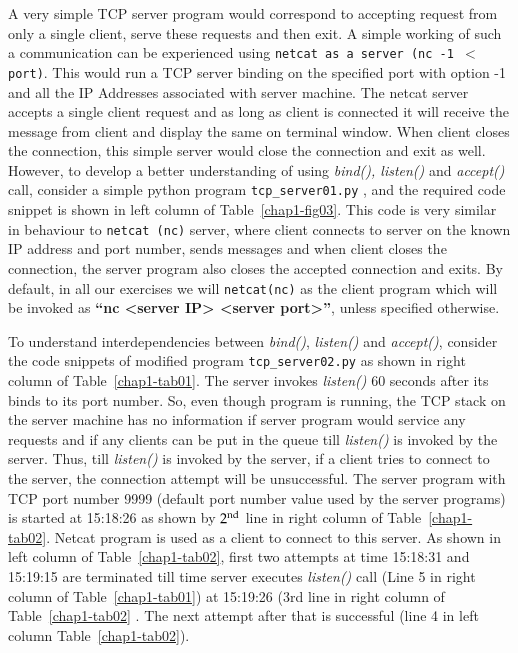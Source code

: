\begin{multicols}{2}
A very simple TCP server program would correspond to accepting request from only a single client, serve these requests and then exit. A simple working of such a communication can be experienced using \texttt{netcat as a server (nc -1 $<$port)}. This would run a TCP server binding on the specified port with option -1 and all the IP Addresses associated with server machine. The netcat server accepts a single client request and as long as client is connected it will receive the message from client and display the same on terminal window. When client closes the connection, this simple server would close the connection and exit as well. However, to develop a better understanding of using \textit{bind(), listen()} and \textit{accept()} call, consider a simple python program \texttt{tcp\_server01.py} \cite{art1-key11}, and the required code snippet is shown in left column of Table~\ref{chap1-fig03}. This code is very similar in behaviour to \texttt{netcat (nc)} server, where client connects to server on the known IP address and port number, sends messages and when client closes the connection, the server program also closes the accepted connection and exits. By default, in all our exercises we will \texttt{netcat(nc)} as the client program which will be invoked as \textbf{“nc <server IP> <server port>”}, unless specified otherwise.

To understand interdependencies between \textit{bind()}, \textit{listen()} and \textit{accept()}, consider the code snippets of modified program \texttt{tcp\_server02.py} \cite{art1-key11} as shown in right column of Table~\ref{chap1-tab01}. The server invokes \textit{listen()} 60 seconds after its binds to its port number. So, even though program is running, the TCP stack on the server machine has no information if server program would service any requests and if any clients can be put in the queue till \textit{listen()} is invoked by the server. Thus, till \textit{listen()} is invoked by the server, if a client tries to connect to the server, the connection attempt will be unsuccessful. The server program with TCP port number 9999 (default port number value used by the server programs) is started at 15:18:26 as shown by $2^{\rm{nd}}$ line in right column of Table~\ref{chap1-tab02}. Netcat program \cite{art1-key12} is used as a client to connect to this server. As shown in left column of Table~\ref{chap1-tab02}, first two attempts at time 15:18:31 and 15:19:15 are terminated till time server executes \textit{listen()} call (Line 5 in right column of Table~\ref{chap1-tab01}) at 15:19:26 (3rd line in right column of Table~\ref{chap1-tab02} . The next attempt after that is successful (line 4 in left column Table~\ref{chap1-tab02}). 


\end{multicols}
